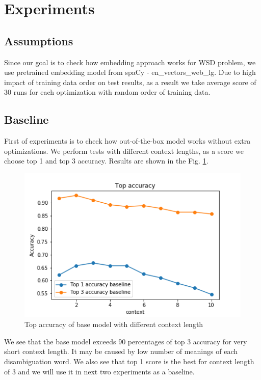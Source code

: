 \documentclass{llncs}
\begin{document}
\section{Experiments}
\subsection{Assumptions}
Since our goal is to check how embedding approach works for WSD problem, we use pretrained embedding model from spaCy - en\_vectors\_web\_lg.
Due to high impact of training data order on test results, as a result we take average score of 30 runs for each optimization with random order of training data.
\subsection{Baseline}
First of experiments is to check how out-of-the-box model works without extra optimizations. We perform tests with different context lengths, as a score we choose top 1 and top 3 accuracy. Results are shown in the Fig. \ref{fig:baseline}.

\begin{figure}
    \label{fig:baseline}
    \caption{Top accuracy of base model with different context length}
    \includegraphics[scale=0.5]{res/baseline_context_top_acc.png}
\end{figure}

We see that the base model exceeds 90 percentages of top 3 accuracy for very short context length. It may be caused by low number of meanings of each disambiguation word.
We also see that top 1 score is the best for context length of 3 and we will use it in next two experiments as a baseline.
\end{document}
